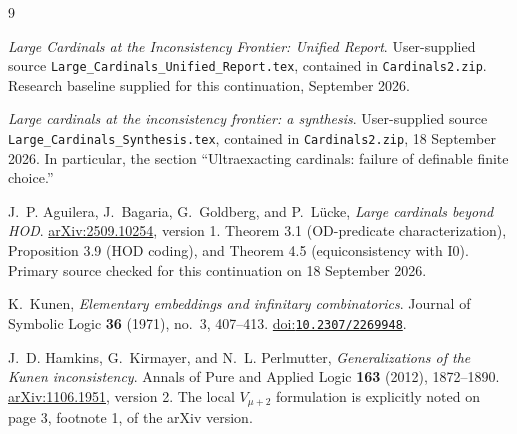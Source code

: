 \documentclass[11pt,letterpaper]{article}
\theoremstyle{definition}
\numberwithin{equation}{section}
\newcommand{\Izero}{\mathrm{I0}}
\newcommand{\arxiv}[1]{\href{https://arxiv.org/abs/#1}{arXiv:#1}}
\newcommand{\doi}[1]{\href{https://doi.org/#1}{doi:\nolinkurl{#1}}}
\begin{document}
\begin{thebibliography}{9}

\emph{Large Cardinals at the Inconsistency Frontier: Unified Report}.
User-supplied source \nolinkurl{Large_Cardinals_Unified_Report.tex}, contained in \nolinkurl{Cardinals2.zip}. Research baseline supplied for this continuation, September 2026.

\emph{Large cardinals at the inconsistency frontier: a synthesis}.
User-supplied source \nolinkurl{Large_Cardinals_Synthesis.tex}, contained in \nolinkurl{Cardinals2.zip}, 18 September 2026. In particular, the section ``Ultraexacting cardinals: failure of definable finite choice.''

J.~P. Aguilera, J.~Bagaria, G.~Goldberg, and P.~L\"ucke,
\emph{Large cardinals beyond HOD}.
\arxiv{2509.10254}, version 1. Theorem 3.1 (OD-predicate characterization), Proposition 3.9 (HOD coding), and Theorem 4.5 (equiconsistency with $\Izero$). Primary source checked for this continuation on 18 September 2026.

K.~Kunen,
\emph{Elementary embeddings and infinitary combinatorics}.
Journal of Symbolic Logic \textbf{36} (1971), no.~3, 407--413.
\doi{10.2307/2269948}.

J.~D. Hamkins, G.~Kirmayer, and N.~L. Perlmutter,
\emph{Generalizations of the Kunen inconsistency}.
Annals of Pure and Applied Logic \textbf{163} (2012), 1872--1890.
\arxiv{1106.1951}, version 2. The local $V_{\mu+2}$ formulation is explicitly noted on page 3, footnote 1, of the arXiv version.

\end{thebibliography}
\end{document}
